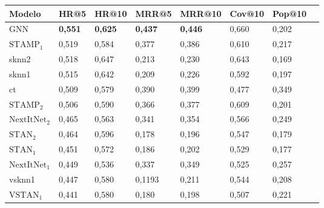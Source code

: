 \begin{table}[htbp]
    \begin{tabular}{|l|l|l|l|l|l|l|l|}
      \hline
      Modelo & HR@5 & HR@10 & MRR@5 & MRR@10 & Cov@10 & Pop@10  \\
      \hline
      GNN & \textbf{0,551} & \textbf{0,625} & \textbf{0,437} & \textbf{0,446} & 0,660 & 0,202  \\
      \hline
      $\text{STAMP}_1$ & 0,519 & 0,584 & 0,377 & 0,386 & 0,610 & 0,217 \\
      \hline
      sknn2 & 0,518 & 0,647 & 0,213 & 0,230 & 0,643 & 0,169 \\
      \hline
      sknn1 & 0,515 & 0,642 & 0,209 & 0,226 & 0,592 & 0,197 \\
      \hline
      ct & 0,509 & 0,579 & 0,390 & 0,399  & 0,477 & 0,349 \\
      \hline
      $\text{STAMP}_2$ & 0,506 & 0,590 & 0,366 & 0,377 & 0,609 & 0,201 \\
      \hline
      $\text{NextItNet}_2$ & 0,465 & 0,563 & 0,341 & 0,354 & 0,566 & 0,249 \\
      \hline
      $\text{STAN}_2$ & 0,464 & 0,596 & 0,178 & 0,196 & 0,547 & 0,179 \\
      \hline
      $\text{STAN}_1$ & 0,451 & 0,572 & 0,186 & 0,202 & 0,529 & 0,177 \\
      \hline
      $\text{NextItNet}_1$ & 0,449 & 0,536 & 0,337 & 0,349 & 0,525 & 0,257\\
      \hline
      vsknn1 & 0,447 & 0,580 & 0,1193 & 0,211 & 0,544 & 0,208 \\
      \hline
      $\text{VSTAN}_1$ & 0,441 & 0,580 & 0,180 & 0,198 & 0,507 & 0,221 \\

\end{tabular}
\end{table}
